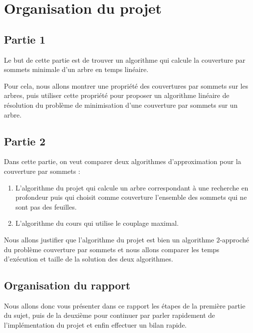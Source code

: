  \section{Organisation du projet}
 
  \subsection{Partie 1}
  Le but de cette partie est de trouver un algorithme qui calcule la
  couverture par sommets minimale d'un arbre en temps linéaire.

  Pour cela, nous allons montrer une propriété des couvertures par
  sommets sur les arbres, puis utiliser cette propriété pour proposer un
  algorithme linéaire de résolution du problème de minimisation d'une
  couverture par sommets sur un arbre.
  
  \subsection{Partie 2}
  Dans cette partie, on veut comparer deux algorithmes d'approximation
  pour la couverture par sommets :
  \begin{enumerate}
   \item L'algorithme du projet qui calcule un arbre correspondant à une
	 recherche en profondeur puis qui choisit comme couverture
	 l'ensemble des sommets qui ne sont pas des feuilles.
   \item L'algorithme du cours qui utilise le couplage maximal.
  \end{enumerate}

  Nous allons justifier que l'algorithme du projet est bien un
  algorithme $2$-approché du problème couverture par sommets et nous
  allons comparer les temps d'exécution et taille de la solution des
  deux algorithmes.

  \subsection{Organisation du rapport}
  Nous allons donc vous présenter dans ce rapport les étapes de la
  première partie du sujet, puis de la deuxième pour continuer par
  parler rapidement de l'implémentation du projet et enfin effectuer un
  bilan rapide.